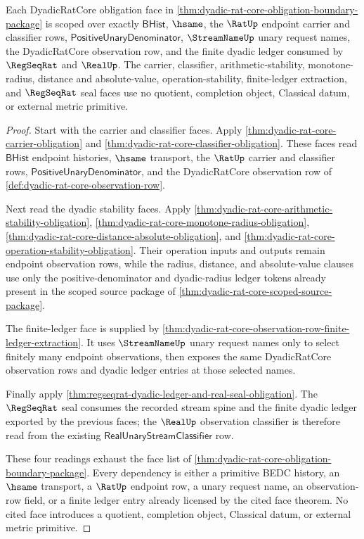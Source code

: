 \begin{theorem}
\label{thm:dyadic-rat-core-scoped-primitive-dependency-package}
Each DyadicRatCore obligation face in
\autoref{thm:dyadic-rat-core-obligation-boundary-package} is scoped over
exactly $\mathsf{BHist}$, $\hsame$, the $\RatUp$ endpoint carrier and
classifier rows, $\mathsf{PositiveUnaryDenominator}$, $\StreamNameUp$ unary
request names, the DyadicRatCore observation row, and the finite dyadic ledger
consumed by $\RegSeqRat$ and $\RealUp$. The carrier, classifier,
arithmetic-stability, monotone-radius, distance and absolute-value,
operation-stability, finite-ledger extraction, and $\RegSeqRat$ seal faces use
no quotient, completion object, Classical datum, or external metric primitive.
\end{theorem}
\begin{proof}
Start with the carrier and classifier faces. Apply
\autoref{thm:dyadic-rat-core-carrier-obligation} and
\autoref{thm:dyadic-rat-core-classifier-obligation}. These faces read
$\mathsf{BHist}$ endpoint histories, $\hsame$ transport, the $\RatUp$ carrier
and classifier rows, $\mathsf{PositiveUnaryDenominator}$, and the
DyadicRatCore observation row of
\autoref{def:dyadic-rat-core-observation-row}.

Next read the dyadic stability faces. Apply
\autoref{thm:dyadic-rat-core-arithmetic-stability-obligation},
\autoref{thm:dyadic-rat-core-monotone-radius-obligation},
\autoref{thm:dyadic-rat-core-distance-absolute-obligation}, and
\autoref{thm:dyadic-rat-core-operation-stability-obligation}. Their operation
inputs and outputs remain endpoint observation rows, while the radius,
distance, and absolute-value clauses use only the positive-denominator and
dyadic-radius ledger tokens already present in the scoped source package of
\autoref{thm:dyadic-rat-core-scoped-source-package}.

The finite-ledger face is supplied by
\autoref{thm:dyadic-rat-core-observation-row-finite-ledger-extraction}. It
uses $\StreamNameUp$ unary request names only to select finitely many endpoint
observations, then exposes the same DyadicRatCore observation rows and dyadic
ledger entries at those selected names.

Finally apply \autoref{thm:regseqrat-dyadic-ledger-and-real-seal-obligation}.
The $\RegSeqRat$ seal consumes the recorded stream spine and the finite dyadic
ledger exported by the previous faces; the $\RealUp$ observation classifier is
therefore read from the existing $\mathsf{RealUnaryStreamClassifier}$ row.

These four readings exhaust the face list of
\autoref{thm:dyadic-rat-core-obligation-boundary-package}. Every dependency is
either a primitive BEDC history, an $\hsame$ transport, a $\RatUp$ endpoint row,
a unary request name, an observation-row field, or a finite ledger entry already
licensed by the cited face theorem. No cited face introduces a quotient,
completion object, Classical datum, or external metric primitive.
\end{proof}

